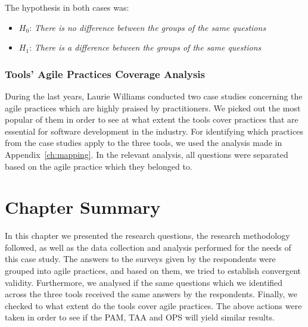The hypothesis in both cases was:
\begin{itemize}[label={}]
	\item $H_0$: \textit{There is no difference between the groups of the same questions}
	\item $H_1$: \textit{There is a difference between the groups of the same questions}
\end{itemize}



\subsubsection{Tools' Agile Practices Coverage Analysis}
\label{subsubsec:coverage_analysis}
During the last years, Laurie Williams conducted two case studies \cite{Williams_Microsoft, laurie_williams} concerning the agile practices which are highly praised by practitioners. We picked out the most popular of them in order to see at what extent the tools cover practices that are essential for software development in the industry. For identifying which practices from the case studies apply to the three tools, we used the analysis made in Appendix~\ref{ch:mapping}. In the relevant analysis, all questions were separated based on the agile practice which they belonged to.

\section{Chapter Summary}
In this chapter we presented the research questions, the research methodology followed, as well as the data collection and analysis performed for the needs of this case study. The answers to the surveys given by the respondents were grouped into agile practices, and based on them, we tried to establish convergent validity. Furthermore, we analysed if the same questions which we identified across the three tools received the same answers by the respondents. Finally, we checked to what extent do the tools cover agile practices. The above actions were taken in order to see if the \ac{PAM}, \ac{TAA} and \ac{OPS} will yield similar results.